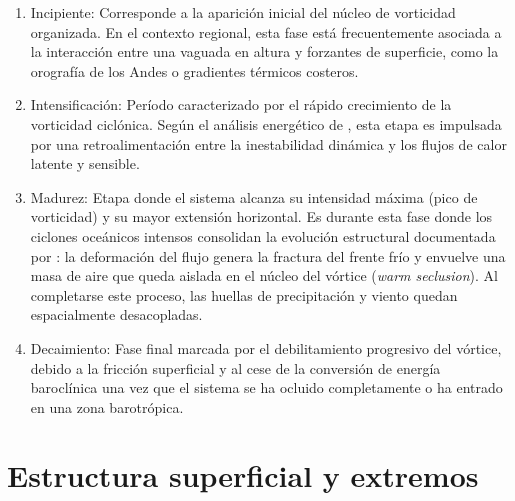 \begin{enumerate}
    \item Incipiente: Corresponde a la aparición inicial del núcleo de vorticidad organizada. En el contexto regional, esta fase está frecuentemente asociada a la interacción entre una vaguada en altura y forzantes de superficie, como la orografía de los Andes o gradientes térmicos costeros.

    \item Intensificación: Período caracterizado por el rápido crecimiento de la vorticidad ciclónica. Según el análisis energético de \citet{coutodesouza2024thesis}, esta etapa es impulsada por una retroalimentación entre la inestabilidad dinámica y los flujos de calor latente y sensible.

    \item Madurez: Etapa donde el sistema alcanza su intensidad máxima (pico de vorticidad) y su mayor extensión horizontal. Es durante esta fase donde los ciclones oceánicos intensos consolidan la evolución estructural documentada por \citet{shapiro1999bridge}: la deformación del flujo genera la fractura del frente frío y envuelve una masa de aire que queda aislada en el núcleo del vórtice (\textit{warm seclusion}). Al completarse este proceso, las huellas de precipitación y viento quedan espacialmente desacopladas.

    \item Decaimiento: Fase final marcada por el debilitamiento progresivo del vórtice, debido a la fricción superficial y al cese de la conversión de energía baroclínica una vez que el sistema se ha ocluido completamente o ha entrado en una zona barotrópica.
\end{enumerate}


\section{Estructura superficial y extremos}\label{sec:tb_compuestos}

